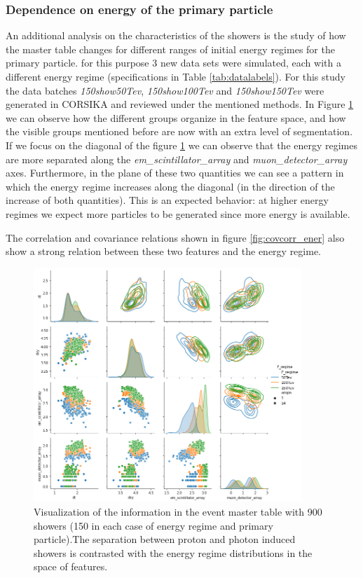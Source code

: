 \documentclass{article}
\begin{document}
\subsubsection{Dependence on energy of the primary particle}
An additional analysis on the characteristics of the showers is the study of how the master table changes for different ranges of initial energy regimes for the primary particle. for this purpose 3 new data sets were simulated, each with a different energy regime (specifications in Table \ref{tab:datalabels}).
For this study the data batches \emph{150show50Tev}, \emph{150show100Tev} and \emph{150show150Tev} were generated in CORSIKA and reviewed under the mentioned methods. In Figure \ref{fig:dataexploration_ener} we can observe how the different groups organize in the feature space, and how the visible groups mentioned before are now with an extra level of segmentation. If we focus on the diagonal  of the figure \ref{fig:dataexploration_ener} we can observe that the energy regimes are more separated along the \emph{em\_scintillator\_array} and \emph{muon\_detector\_array} axes. Furthermore, in the plane of these two quantities we can see a pattern in which the energy regime increases along the diagonal (in the direction of the increase of both quantities). This is an expected behavior: at higher energy regimes we expect more particles to be generated since more energy is available.

The correlation and covariance relations shown in figure \ref{fig:covcorr_ener} also show a strong relation between these two features and the energy regime.

\begin{figure}[!h]
    \centering
    \includegraphics[width=0.9\textwidth]{imgs/data_exp_ener.png}
    \caption{Visualization of the information in the event master table with 900 showers (150 in each case of energy regime and primary particle).The separation between proton and photon induced showers is contrasted with the energy regime distributions in the space of features. }
    \label{fig:dataexploration_ener}
\end{figure}
\end{document}
